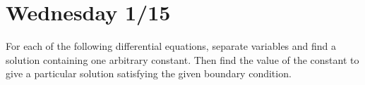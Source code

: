 \documentclass{article}
\begin{document}
\section{Wednesday 1/15}
For each of the following differential equations, separate variables and find a solution
containing one arbitrary constant. Then find the value of the constant to give a particular solution satisfying the given boundary condition.
\begin{enumerate}
    
    
    
    
\pagebreak
    
    
\pagebreak
    
    
\pagebreak
    
    
\pagebreak
    
        
\end{enumerate}
\end{document}
